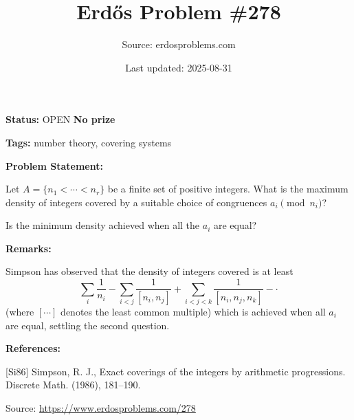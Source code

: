 \documentclass{article}
\title{Erd\H{o}s Problem \#278}
\date{Last updated: 2025-08-31}
\author{Source: erdosproblems.com}
\begin{document}
\maketitle

\noindent\textbf{Status:} OPEN \quad \textbf{No prize}

\noindent\textbf{Tags:} number theory, covering systems

\medskip
\noindent\textbf{Problem Statement:}

Let $A=\{n_1<\cdots<n_r\}$ be a finite set of positive integers. What is the maximum density of integers covered by a suitable choice of congruences $a_i\pmod{n_i}$?

Is the minimum density achieved when all the $a_i$ are equal?

\bigskip
\noindent\textbf{Remarks:}

Simpson \cite{Si86} has observed that the density of integers covered is at least\[\sum_i \frac{1}{n_i}-\sum_{i<j}\frac{1}{[n_i,n_j]}+\sum_{i<j<k}\frac{1}{[n_i,n_j,n_k]}-\cdot\](where $[\cdots]$ denotes the least common multiple) which is achieved when all $a_i$ are equal, settling the second question.

\bigskip
\noindent\textbf{References:}

[Si86] Simpson, R. J., Exact coverings of the integers by arithmetic progressions. Discrete Math. (1986), 181--190.

\bigskip
\noindent\small{Source: \url{https://www.erdosproblems.com/278}}
\end{document}
